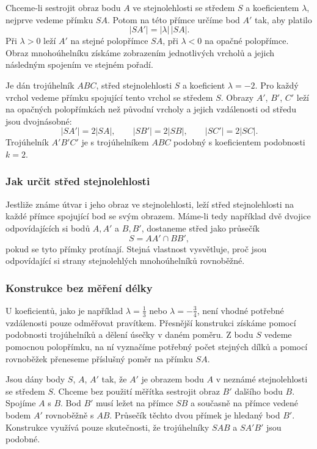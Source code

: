 \documentclass[12pt,a4paper]{article}
\begin{document}
Chceme-li sestrojit obraz bodu $A$ ve stejnolehlosti se středem $S$ a koeficientem $\lambda$, nejprve vedeme přímku $SA$. Potom na této přímce určíme bod $A'$ tak, aby platilo
\[
    |SA'|=|\lambda|\,|SA|.
\]
Při $\lambda>0$ leží $A'$ na stejné polopřímce $SA$, při $\lambda<0$ na opačné polopřímce. Obraz mnohoúhelníku získáme zobrazením jednotlivých vrcholů a jejich následným spojením ve stejném pořadí.

\begin{examplebox}
    Je dán trojúhelník $ABC$, střed stejnolehlosti $S$ a koeficient $\lambda=-2$. Pro každý vrchol vedeme přímku spojující tento vrchol se středem $S$. Obrazy $A'$, $B'$, $C'$ leží na opačných polopřímkách než původní vrcholy a jejich vzdálenosti od středu jsou dvojnásobné:
    \[
        |SA'|=2|SA|,\qquad
        |SB'|=2|SB|,\qquad
        |SC'|=2|SC|.
    \]
    Trojúhelník $A'B'C'$ je s trojúhelníkem $ABC$ podobný s koeficientem podobnosti $k=2$.
\end{examplebox}




\subsubsection*{Jak určit střed stejnolehlosti}

Jestliže známe útvar i jeho obraz ve stejnolehlosti, leží střed stejnolehlosti na každé přímce spojující bod se svým obrazem. Máme-li tedy například dvě dvojice odpovídajících si bodů $A,A'$ a $B,B'$, dostaneme střed jako průsečík
\[
    S=AA'\cap BB',
\]
pokud se tyto přímky protínají. Stejná vlastnost vysvětluje, proč jsou odpovídající si strany stejnolehlých mnohoúhelníků rovnoběžné.

\subsubsection*{Konstrukce bez měření délky}

U koeficientů, jako je například $\lambda=\frac13$ nebo $\lambda=-\frac34$, není vhodné potřebné vzdálenosti pouze odměřovat pravítkem. Přesnější konstrukci získáme pomocí podobnosti trojúhelníků a dělení úsečky v daném poměru. Z bodu $S$ vedeme pomocnou polopřímku, na ní vyznačíme potřebný počet stejných dílků a pomocí rovnoběžek přeneseme příslušný poměr na přímku $SA$.

\begin{examplebox}
    Jsou dány body $S$, $A$, $A'$ tak, že $A'$ je obrazem bodu $A$ v neznámé stejnolehlosti se středem $S$. Chceme bez použití měřítka sestrojit obraz $B'$ dalšího bodu $B$. Spojíme $A$ s $B$. Bod $B'$ musí ležet na přímce $SB$ a současně na přímce vedené bodem $A'$ rovnoběžně s $AB$. Průsečík těchto dvou přímek je hledaný bod $B'$. Konstrukce využívá pouze skutečnosti, že trojúhelníky $SAB$ a $SA'B'$ jsou podobné.
\end{examplebox}
\end{document}
